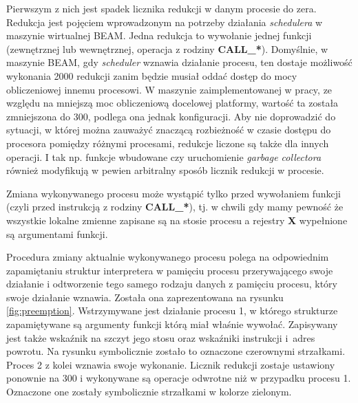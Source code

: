 Pierwszym z nich jest spadek licznika redukcji w danym procesie do zera.
Redukcja jest pojęciem wprowadzonym na potrzeby działania \emph{schedulera} w maszynie wirtualnej BEAM.
Jedna redukcja to wywołanie jednej funkcji (zewnętrznej lub wewnętrznej, operacja z rodziny \textbf{CALL\_*}).
Domyślnie, w maszynie BEAM, gdy \emph{scheduler} wznawia działanie procesu, ten dostaje możliwość wykonania 2000 redukcji zanim będzie musiał oddać dostęp do mocy obliczeniowej innemu procesowi.
W maszynie zaimplementowanej w pracy, ze względu na mniejszą moc obliczeniową docelowej platformy, wartość ta została zmniejszona do 300, podlega ona jednak konfiguracji.
Aby nie doprowadzić do sytuacji, w której można zauważyć znaczącą rozbieżność w czasie dostępu do procesora pomiędzy różnymi procesami, redukcje liczone są także dla innych operacji.
I tak np. funkcje wbudowane czy uruchomienie \emph{garbage collectora} również modyfikują w pewien arbitralny sposób licznik redukcji w procesie. 

Zmiana wykonywanego procesu może wystąpić tylko przed wywołaniem funkcji (czyli przed instrukcją z rodziny \textbf{CALL\_*}), tj. w chwili gdy mamy pewność że wszystkie lokalne zmienne zapisane są na stosie procesu a rejestry \textbf{X} wypełnione są argumentami funkcji.

Procedura zmiany aktualnie wykonywanego procesu polega na odpowiednim zapamiętaniu struktur interpretera w pamięciu procesu przerywającego swoje działanie i odtworzenie tego samego rodzaju danych z pamięciu procesu, który swoje działanie wznawia.
Została ona zaprezentowana na rysunku \ref{fig:preemption}.
Wstrzymywane jest działanie procesu 1, w którego strukturze zapamiętywane są argumenty funkcji którą miał właśnie wywołać.
Zapisywany jest także wskaźnik na szczyt jego stosu oraz wskaźniki instrukcji i~adres powrotu. Na rysunku symbolicznie zostało to oznaczone czerownymi strzałkami.
Proces 2 z kolei wznawia swoje wykonanie. Licznik redukcji zostaje ustawiony ponownie na 300 i wykonywane są operacje odwrotne niż w przypadku procesu 1.
Oznaczone one zostały symbolicznie strzałkami w kolorze zielonym.

